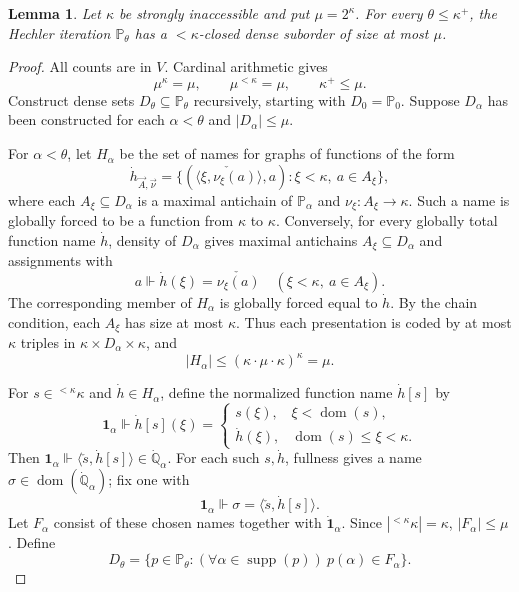 \documentclass[10pt,a4paper]{amsart}
\newtheorem{lemma}[theorem]{Lemma}
\theoremstyle{definition}
\theoremstyle{remark}
\newcommand{\PP}{\mathbb P}
\DeclareMathOperator{\dom}{dom}
\DeclareMathOperator{\supp}{supp}
\begin{document}
\begin{lemma}\label{lem:iteration-size}
Let \(\kappa\) be strongly inaccessible and put \(\mu=2^\kappa\).
For every \(\theta\leq\kappa^+\), the Hechler iteration
\(\PP_\theta\) has a \(<\kappa\)-closed dense suborder of
size at most \(\mu\).
\end{lemma}
\begin{proof}
All counts are in \(V\). Cardinal arithmetic gives
\[
 \mu^\kappa=\mu,\qquad \mu^{<\kappa}=\mu,
 \qquad\kappa^+\leq\mu.
\]
Construct dense sets \(D_\theta\subseteq\PP_\theta\)
recursively, starting with \(D_0=\PP_0\). Suppose
\(D_\alpha\) has been constructed for each \(\alpha<\theta\)
and \(|D_\alpha|\leq\mu\).

For \(\alpha<\theta\), let \(H_\alpha\) be the set of
names for graphs of functions of the form
\[
 \dot h_{\vec A,\vec\nu}=
 \{(\check{\langle\xi,\nu_\xi(a)\rangle},a):
                       \xi<\kappa,\ a\in A_\xi\},
\]
where each \(A_\xi\subseteq D_\alpha\) is a maximal
antichain of \(\PP_\alpha\) and
\(\nu_\xi:A_\xi\to\kappa\). Such a name is globally
forced to be a function from \(\kappa\) to \(\kappa\).
Conversely, for every globally total function name
\(\dot h\), density of \(D_\alpha\) gives maximal
antichains \(A_\xi\subseteq D_\alpha\) and assignments with
\[
 a\Vdash\dot h(\xi)=\check{\nu_\xi(a)}
                            \quad(\xi<\kappa,\ a\in A_\xi).
\]
The corresponding member of \(H_\alpha\) is globally
forced equal to \(\dot h\). By the chain condition,
each \(A_\xi\) has size at most \(\kappa\). Thus each
presentation is coded by at most \(\kappa\) triples in
\(\kappa\times D_\alpha\times\kappa\), and
\[
 |H_\alpha|\leq
            (\kappa\cdot\mu\cdot\kappa)^\kappa=\mu.
\]

For \(s\in{}^{<\kappa}\kappa\) and \(\dot h\in H_\alpha\),
define the normalized function name \(\dot h[s]\) by
\[
 \mathbf1_\alpha\Vdash\dot h[s](\xi)=
 \begin{cases}
  s(\xi),&\xi<\dom(s),\\
  \dot h(\xi),&\dom(s)\leq\xi<\kappa.
 \end{cases}
\]
Then \(\mathbf1_\alpha\Vdash
\langle\check s,\dot h[s]\rangle
                                      \in\dot{\mathbb Q}_\alpha\).
For each such \(s,\dot h\), fullness gives a name
\(\sigma\in\dom(\dot{\mathbb Q}_\alpha)\); fix one with
\[
 \mathbf1_\alpha\Vdash
                 \sigma=\langle\check s,\dot h[s]\rangle.
\]
Let \(F_\alpha\) consist of these chosen names together
with \(\dot{\mathbf1}_\alpha\).
Since \(|{}^{<\kappa}\kappa|=\kappa\),
\(|F_\alpha|\leq\mu\). Define
\[
 D_\theta=\{p\in\PP_\theta:
       (\forall\alpha\in\supp(p))\ p(\alpha)\in F_\alpha\}.
\]


\end{proof}
\end{document}
